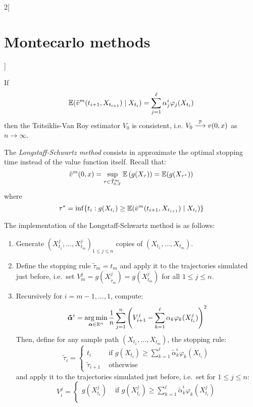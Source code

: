 \documentclass[../../../main_math.tex]{subfiles}
\begin{document}
\begin{multicols}{2}[\section{Montecarlo methods}]
\begin{proposition}
\begin{enumerate}
    \end{enumerate}
  \end{proposition}
  \begin{theorem}
    If $$
      \Exp(\tilde{v}^m(t_{i+1},X_{t_{i+1}})\mid X_{t_i})=\sum_{j=1}^\ell \alpha_j^i\varphi_j(X_{t_i})
    $$
    then the Tsitsiklis-Van Roy estimator $V_0$ is consistent, i.e. $V_0\overset{\Prob}{\longrightarrow}v(0,x)$ as $n\to\infty$.
  \end{theorem}
  \begin{definition}
    The \emph{Longstaff-Schwartz method} consists in approximate the optimal stopping time instead of the value function itself. Recall that:
    $$
      \tilde{v}^m(0,x)=\sup_{\tau\in\tilde{\mathcal{T}}_{0,T}^m}\Exp\left(g(X_\tau)\right)=\Exp(g(X_{\tau^*}))
    $$
    where $$
      \tau^*=\inf\{t_i: g(X_{t_i})\geq \Exp(\tilde{v}^m(t_{i+1},X_{t_{i+1}})\mid X_{t_i})\}
    $$
  \end{definition}
  \begin{proposition}
    The implementation of the Longstaff-Schwartz method is as follows:
    \begin{enumerate}
      \item Generate ${(X_{t_1}^j,\ldots,X_{t_m}^j)}_{1\leq j\leq n}$ \iid copies of $(X_{t_1},\ldots,X_{t_m})$.
      \item Define the stopping rule $\tilde{\tau}_m=t_m$ and apply it to the trajectories simulated just before, i.e.\ set $V_m^j=g(X_{\tilde{\tau}_m}^j)=g(X_{t_m}^j)$ for all $1\leq j\leq n$.
      \item Recursively for $i=m-1,\ldots,1$, compute:
            $$
              \vf{\tilde\alpha}^i=\argmin_{\vf\alpha\in\RR^n}\frac{1}{n}\sum_{j=1}^n\left(V_{i+1}^j-\sum_{k=1}^\ell\alpha_k\varphi_k(X_{t_i}^j)\right)^2
            $$
            Then, define for any sample path $(X_{t_1},\ldots,X_{t_m})$, the stopping rule:
            $$
              \tilde{\tau}_i=\begin{cases}
                t_i                & \text{ if } g(X_{t_i})\geq \sum_{k=1}^\ell\tilde{\alpha}_k^i\varphi_k(X_{t_i}) \\
                \tilde{\tau}_{i+1} & \text{ otherwise}
              \end{cases}
            $$
            and apply it to the trajectories simulated just before, i.e.\ set for $1\leq j\leq n$:
            $$
              V_i^j=\begin{cases}
                g(X_{t_i}^j) & \text{ if } g(X_{t_i}^j)\geq \sum_{k=1}^\ell\tilde{\alpha}_k^i\varphi_k(X_{t_i}^j) \\

\end{cases}$$
\end{enumerate}
\end{proposition}
\end{multicols}
\end{document}
